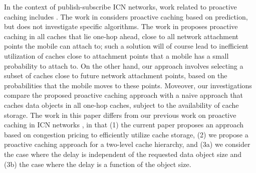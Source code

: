 \documentclass[conference]{IEEEtran}
\begin{document}
In the context of publish-subscribe ICN networks, work related to proactive caching includes \cite{burcea2004disconnected,gaddah2010extending}.
The work in \cite{burcea2004disconnected} considers proactive caching based on prediction, but does not investigate  specific algorithms.
The work in \cite{gaddah2010extending} proposes proactive caching in all caches that lie one-hop ahead, close to all network attachment points the mobile can attach to; such a solution will of course lead to inefficient utilization of caches close to attachment points that a mobile has a small probability to attach to. On the other hand, our approach involves selecting a subset of caches close to future network attachment points, based on the probabilities that the mobile  moves to these points.
Moveover, our investigations compare the proposed proactive caching approach with a naive approach that caches data objects in all one-hop caches, subject to the availability of cache storage.
The  work in this paper differs from our previous work on proactive caching in ICN networks \cite{Vas++12}, in that (1) the current paper proposes an approach based on congestion pricing to efficiently utilize cache storage, (2) we propose a proactive caching approach for a two-level cache hierarchy, and (3a) we consider the case where the delay is independent of the requested data object size and (3b) the case where the delay is a function of the object size.
\end{document}
